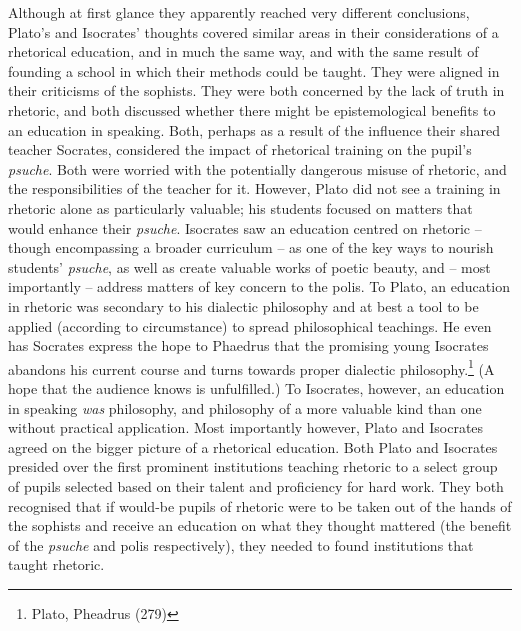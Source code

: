 \begin{multicols}{2}
Although at first glance they apparently reached very different
conclusions, Plato's and Isocrates' thoughts covered similar areas in
their considerations of a rhetorical education, and in much the same
way, and with the same result of founding a school in which their
methods could be taught. They were aligned in their criticisms of the
sophists. They were both concerned by the lack of truth in rhetoric, and
both discussed whether there might be epistemological benefits to an
education in speaking. Both, perhaps as a result of the influence their
shared teacher Socrates, considered the impact of rhetorical training on
the pupil's \emph{psuche}. Both were worried with the potentially
dangerous misuse of rhetoric, and the responsibilities of the teacher
for it. However, Plato did not see a training in rhetoric alone as
particularly valuable; his students focused on matters that would
enhance their \emph{psuche}. Isocrates saw an education centred on
rhetoric -- though encompassing a broader curriculum -- as one of the
key ways to nourish students' \emph{psuche}, as well as create valuable
works of poetic beauty, and -- most importantly -- address matters of
key concern to the polis. To Plato, an education in rhetoric was
secondary to his dialectic philosophy and at best a tool to be applied
(according to circumstance) to spread philosophical teachings. He even
has Socrates express the hope to Phaedrus that the promising young
Isocrates abandons his current course and turns towards proper dialectic
philosophy.\footnote{\textsuperscript{} Plato, Pheadrus (279)} (A hope
that the audience knows is unfulfilled.) To Isocrates, however, an
education in speaking \emph{was} philosophy, and philosophy of a more
valuable kind than one without practical application. Most importantly
however, Plato and Isocrates agreed on the bigger picture of a
rhetorical education. Both Plato and Isocrates presided over the first
prominent institutions teaching rhetoric to a select group of pupils
selected based on their talent and proficiency for hard work. They both
recognised that if would-be pupils of rhetoric were to be taken out of
the hands of the sophists and receive an education on what they thought
mattered (the benefit of the \emph{psuche} and polis respectively), they
needed to found institutions that taught rhetoric.

\end{multicols}

